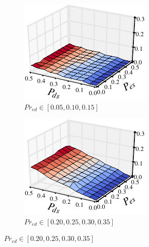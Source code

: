 \begin{figure}[t!]
  \centering
  \begin{subfigure}{0.33\textwidth}
    \centering
    \includegraphics[width=\textwidth]{./figures/scripts/MutationDUTJaccard3DFigure_0_10.pdf}
    \caption{$Pr_{ed} \in [0.05, 0.10, 0.15]$}
  \end{subfigure}\hspace*{0.01\textwidth}
  \begin{subfigure}{0.33\textwidth}
    \centering
    \includegraphics[width=\textwidth]{./figures/scripts/MutationDUTJaccard3DFigure_0_30.pdf}
    \caption{$Pr_{ed} \in [0.20, 0.25, 0.30, 0.35]$}

\end{subfigure}
\end{figure}
